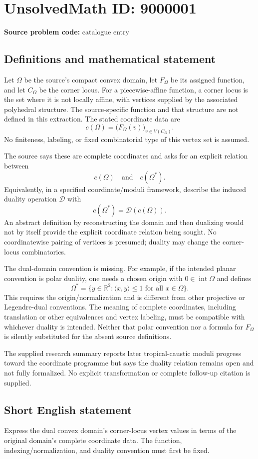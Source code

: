 \documentclass[11pt]{article}
\newcommand{\R}{\mathbb{R}}
\begin{document}
\section*{UnsolvedMath ID: 9000001}
\textbf{Source problem code:} catalogue entry
\subsection{Definitions and mathematical statement}
Let \(\Omega\) be the source's compact convex domain, let \(F_\Omega\) be its assigned function, and let \(C_\Omega\) be the corner locus. For a piecewise-affine function, a corner locus is the set where it is not locally affine, with vertices supplied by the associated polyhedral structure. The source-specific function and that structure are not defined in this extraction. The stated coordinate data are
\[
c(\Omega)=\bigl(F_\Omega(v)\bigr)_{v\in V(C_\Omega)}.
\]
No finiteness, labeling, or fixed combinatorial type of this vertex set is assumed.

The source says these are complete coordinates and asks for an explicit relation between
\[
c(\Omega)\quad\text{and}\quad c(\Omega^*).
\]
Equivalently, in a specified coordinate/moduli framework, describe the induced duality operation \(\mathcal D\) with
\[
c(\Omega^*)=\mathcal D(c(\Omega)).
\]
An abstract definition by reconstructing the domain and then dualizing would not by itself provide the explicit coordinate relation being sought. No coordinatewise pairing of vertices is presumed; duality may change the corner-locus combinatorics.

The dual-domain convention is missing. For example, if the intended planar convention is polar duality, one needs a chosen origin with \(0\in\operatorname{int}\Omega\) and defines
\[
\Omega^*=\{y\in\R^2:\langle x,y\rangle\le1\text{ for all }x\in\Omega\}.
\]
This requires the origin/normalization and is different from other projective or Legendre-dual conventions. The meaning of complete coordinates, including translation or other equivalences and vertex labeling, must be compatible with whichever duality is intended. Neither that polar convention nor a formula for \(F_\Omega\) is silently substituted for the absent source definitions.

The supplied research summary reports later tropical-caustic moduli progress toward the coordinate programme but says the duality relation remains open and not fully formalized. No explicit transformation or complete follow-up citation is supplied.
\subsection{Short English statement}
Express the dual convex domain's corner-locus vertex values in terms of the original domain's complete coordinate data. The function, indexing/normalization, and duality convention must first be fixed.
\end{document}
